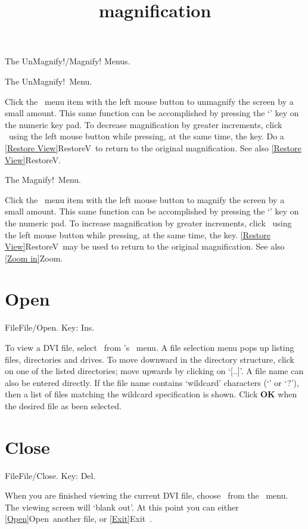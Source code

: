 \newpage   

\title{magnification}The UnMagnify!/Magnify! Menus.

The UnMagnify!~Menu.

Click the \ menu item with the left mouse button to
unmagnify the screen by a small amount.  This same function can be
accomplished by pressing the `\minus' key on the numeric key pad.  To decrease
magnification by greater increments, click \ using the
left mouse button while pressing, at the same time, the  key.
Do a \ref{Restore View}{RestoreV}\ to return to the original magnification.
   \medskip
See also \ref{Restore View}{RestoreV}.
   \bigskip

The Magnify!~Menu.

Click the \ menu item with the left mouse button to magnify
the screen by a small amount.  This same function can be accomplished by
pressing the `\plus' key on the numeric pad.  To increase magnification by
greater increments, click \ using the left mouse button
while pressing, at the same time, the  key. \ref{Restore
View}{RestoreV}\ may be used to return to the original magnification.
    \medskip
See also \ref{Zoom in}{Zoom}.

\newpage

\section{Open}{File}File/Open\ellipses. Key: Ins.

To view a DVI file, select \ from 's 
\ menu. A file selection menu pops up listing files,
directories and drives.  To move downward in the directory structure,
click on one of the listed directories; move upwards by clicking on
`[..]'.  A file name can also be entered directly.  If the file name
contains `wildcard' characters (`\asterisk' or `?'), then a list of
files matching the wildcard specification is shown. Click {\bf OK} when
the desired file as been selected.
   \bigskip

\section{Close}{File}File/Close. Key: Del.

When you are finished viewing the current DVI file, choose \ from
the \ menu.  The viewing screen will `blank out'.  At this point
you can either \ref{Open}{Open}\ another file, or \ref{Exit}{Exit}\
.
   \bigskip

